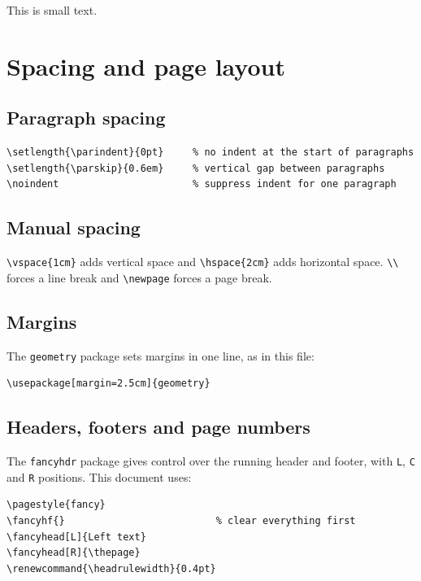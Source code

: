 \documentclass[11pt,a4paper]{article}
\renewcommand{\headrulewidth}{0.4pt}
\begin{document}
{\small This is small text.} 

\section{Spacing and page layout}

\subsection{Paragraph spacing}

\begin{verbatim}
\setlength{\parindent}{0pt}     % no indent at the start of paragraphs
\setlength{\parskip}{0.6em}     % vertical gap between paragraphs
\noindent                       % suppress indent for one paragraph
\end{verbatim}

\subsection{Manual spacing}

\verb|\vspace{1cm}| adds vertical space and \verb|\hspace{2cm}| adds
horizontal space. \verb|\\| forces a line break and \verb|\newpage|
forces a page break.

\subsection{Margins}

The \texttt{geometry} package sets margins in one line, as in this file:
\begin{verbatim}
\usepackage[margin=2.5cm]{geometry}
\end{verbatim}

\subsection{Headers, footers and page numbers}

The \texttt{fancyhdr} package gives control over the running header
and footer, with \verb|L|, \verb|C| and \verb|R| positions. This
document uses:
\begin{verbatim}
\pagestyle{fancy}
\fancyhf{}                          % clear everything first
\fancyhead[L]{Left text}
\fancyhead[R]{\thepage}
\renewcommand{\headrulewidth}{0.4pt}
\end{verbatim}
\end{document}

